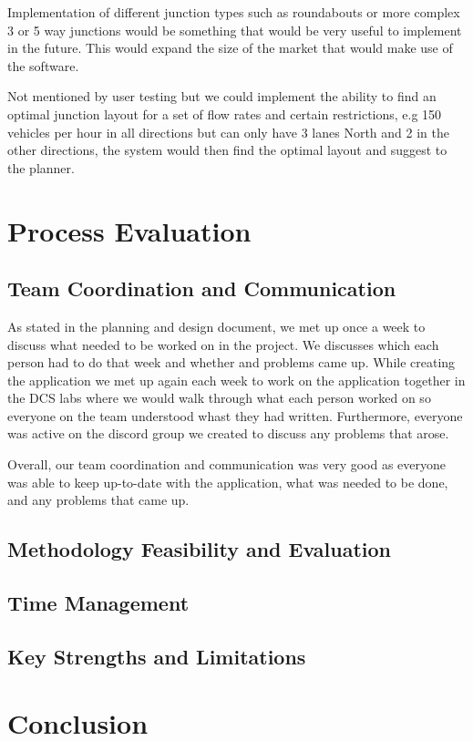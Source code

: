 \documentclass{article}
\begin{document}
    Implementation of different junction types such as roundabouts or more complex 3 or 5 way junctions would be something
    that would be very useful to implement in the future. This would expand the size of the market that would make use
    of the software.

    Not mentioned by user testing but we could implement the ability to find an optimal junction layout for a set of
    flow rates and certain restrictions, e.g 150 vehicles per hour in all directions but can only have 3 lanes North and
    2 in the other directions, the system would then find the optimal layout and suggest to the planner.

    \section{Process Evaluation}

    \subsection{Team Coordination and Communication}
    As stated in the planning and design document, we met up once a week to discuss what needed to be worked on in the project. We discusses which each person had to do that week and whether and problems came up. While creating the application we met up again each week to work on the application together in the DCS labs where we would walk through what each person worked on so everyone on the team understood whast they had written. Furthermore, everyone was active on the discord group we created to discuss any problems that arose.

    Overall, our team coordination and communication was very good as everyone was able to keep up-to-date with the application, what was needed to be done, and any problems that came up.

    \subsection{Methodology Feasibility and Evaluation}

    \subsection{Time Management}

    \subsection{Key Strengths and Limitations}


    \section{Conclusion}
\end{document}
